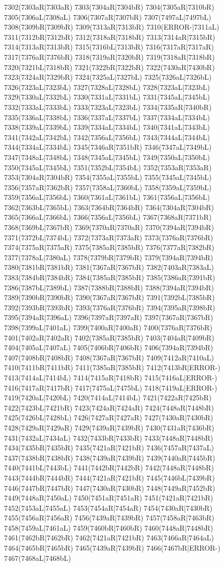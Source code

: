 7302(7303aR|7303aR) 7303(7304aR|7304bR) 7304(7305aR|7310bR) 7305(7306aL|7308aL) 7306(7307aR|7307bR) 7307(7497aL|7497bL) 7308(7309bR|7309bR) 7309(7313aR|7313bR) 7310(ERROR-|7311aL) 7311(7312bR|7312bR) 7312(7318aR|7318bR) 7313(7314aR|7315bR) 7314(7313aR|7313bR) 7315(7316bL|7313bR) 7316(7317aR|7317aR) 7317(7376aR|7376bR) 7318(7319aR|7320bR) 7319(7318aR|7318bR) 7320(7321bL|7318bR) 7321(7322bR|7322bR) 7322(7430aR|7430bR) 7323(7324aR|7329bR) 7324(7325aL|7327bL) 7325(7326aL|7326bL) 7326(7323aL|7323bL) 7327(7328aL|7328bL) 7328(7323aL|7323bL) 7329(7330aL|7332bL) 7330(7331aL|7331bL) 7331(7345aL|7345bL) 7332(7333aL|7333bL) 7333(7323aL|7323bL) 7334(7335aR|7340bR) 7335(7336aL|7338bL) 7336(7337aL|7337bL) 7337(7334aL|7334bL) 7338(7339aL|7339bL) 7339(7334aL|7334bL) 7340(7341aL|7343bL) 7341(7342aL|7342bL) 7342(7356aL|7356bL) 7343(7344aL|7344bL) 7344(7334aL|7334bL) 7345(7346aR|7351bR) 7346(7347aL|7349bL) 7347(7348aL|7348bL) 7348(7345aL|7345bL) 7349(7350aL|7350bL) 7350(7345aL|7345bL) 7351(7352bL|7354bL) 7352(7353aR|7353aR) 7353(7304aR|7304bR) 7354(7355aL|7355bL) 7355(7345aL|7345bL) 7356(7357aR|7362bR) 7357(7358aL|7360bL) 7358(7359aL|7359bL) 7359(7356aL|7356bL) 7360(7361aL|7361bL) 7361(7356aL|7356bL) 7362(7363bL|7365bL) 7363(7364bR|7364bR) 7364(7304aR|7304bR) 7365(7366aL|7366bL) 7366(7356aL|7356bL) 7367(7368aR|7371bR) 7368(7369bL|7367bR) 7369(7370aR|7370aR) 7370(7394aR|7394bR) 7371(7372bL|7374bL) 7372(7373aR|7373aR) 7373(7376aR|7376bR) 7374(7375aR|7375aR) 7375(7385aR|7385bR) 7376(7377aR|7382bR) 7377(7378aL|7380aL) 7378(7379bR|7379bR) 7379(7394aR|7394bR) 7380(7381bR|7381bR) 7381(7367aR|7367bR) 7382(7403aR|7383aL) 7383(7384bR|7384bR) 7384(7385aR|7385bR) 7385(7386aR|7391bR) 7386(7387bL|7389bL) 7387(7388bR|7388bR) 7388(7394aR|7394bR) 7389(7390bR|7390bR) 7390(7367aR|7367bR) 7391(7392bL|7385bR) 7392(7393bR|7393bR) 7393(7376aR|7376bR) 7394(7395aR|7398bR) 7395(7394aR|7396aL) 7396(7397aR|7397aR) 7397(7367aR|7367bR) 7398(7399aL|7401aL) 7399(7400aR|7400aR) 7400(7376aR|7376bR) 7401(7402aR|7402aR) 7402(7385aR|7385bR) 7403(7404aR|7409bR) 7404(7405aL|7407aL) 7405(7406bR|7406bR) 7406(7394aR|7394bR) 7407(7408bR|7408bR) 7408(7367aR|7367bR) 7409(7412aR|7410aL) 7410(7411bR|7411bR) 7411(7385aR|7385bR) 7412(7413bR|ERROR-) 7413(7414aL|7414bL) 7414(7415aR|7418bR) 7415(7416aL|ERROR-) 7416(7417aR|7417bR) 7417(7475aL|7475bL) 7418(7419aL|ERROR-) 7419(7420aL|7420bL) 7420(7414aL|7414bL) 7421(7422aR|7425bR) 7422(7423bL|7421bR) 7423(7424aR|7424aR) 7424(7448aR|7448bR) 7425(7426bL|7428bL) 7426(7427aR|7427aR) 7427(7430aR|7430bR) 7428(7429aR|7429aR) 7429(7439aR|7439bR) 7430(7431aR|7436bR) 7431(7432aL|7434aL) 7432(7433bR|7433bR) 7433(7448aR|7448bR) 7434(7435bR|7435bR) 7435(7421aR|7421bR) 7436(7457aR|7437aL) 7437(7438bR|7438bR) 7438(7439aR|7439bR) 7439(7440aR|7445bR) 7440(7441bL|7443bL) 7441(7442bR|7442bR) 7442(7448aR|7448bR) 7443(7444bR|7444bR) 7444(7421aR|7421bR) 7445(7446bL|7439bR) 7446(7447bR|7447bR) 7447(7430aR|7430bR) 7448(7449aR|7452bR) 7449(7448aR|7450aL) 7450(7451aR|7451aR) 7451(7421aR|7421bR) 7452(7453aL|7455aL) 7453(7454aR|7454aR) 7454(7430aR|7430bR) 7455(7456aR|7456aR) 7456(7439aR|7439bR) 7457(7458aR|7463bR) 7458(7459aL|7461aL) 7459(7460bR|7460bR) 7460(7448aR|7448bR) 7461(7462bR|7462bR) 7462(7421aR|7421bR) 7463(7466aR|7464aL) 7464(7465bR|7465bR) 7465(7439aR|7439bR) 7466(7467bR|ERROR-) 7467(7468aL|7468bL) 